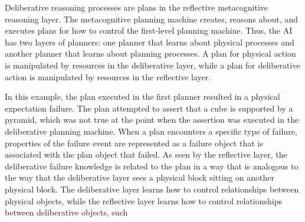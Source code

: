 Deliberative reasoning processes are plans in the reflective
metacognitive reasoning layer.  The metacognitive planning machine
creates, reasons about, and executes plans for how to control the
first-level planning machine.  Thus, the AI has two layers of
planners: one planner that learns about physical processes and another
planner that learns about planning processes.  A plan for physical
action is manipulated by resources in the deliberative layer, while a
plan for deliberative action is manipulated by resources in the
reflective layer.

In this example, the plan executed in the first planner resulted in a
physical expectation failure.  The plan attempted to assert that a
cube is supported by a pyramid, which was not true at the point when
the assertion was executed in the deliberative planning machine.  When
a plan encounters a specific type of failure, properties of the
failure event are represented as a failure object that is associated
with the plan object that failed.  As seen by the reflective layer,
the deliberative failure knowledge is related to the plan in a way
that is analogous to the way that the deliberative layer sees a
physical block sitting on another physical block.  The deliberative
layer learns how to control relationships between physical objects,
while the reflective layer learns how to control relationships between
deliberative objects, such
